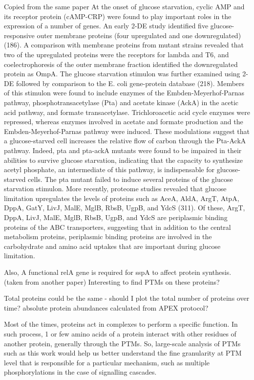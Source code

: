 \documentclass[12pt]{article}
\begin{document}
Copied from the same paper At the onset of glucose starvation, cyclic AMP and its receptor protein (cAMP-CRP) were found to play important roles in the expression of a number of genes. An early 2-DE study identified five glucose-responsive outer membrane proteins (four upregulated and one downregulated) (186). A comparison with membrane proteins from mutant strains revealed that two of the upregulated proteins were the receptors for lambda and T6, and coelectrophoresis of the outer membrane fraction identified the downregulated protein as OmpA. The glucose starvation stimulon was further examined using 2-DE followed by comparison to the E. coli gene-protein database (218). Members of this stimulon were found to include enzymes of the Embden-Meyerhof-Parnas pathway, phosphotransacetylase (Pta) and acetate kinase (AckA) in the acetic acid pathway, and formate transacetylase. Trichloroacetic acid cycle enzymes were repressed, whereas enzymes involved in acetate and formate production and the Embden-Meyerhof-Parnas pathway were induced. These modulations suggest that a glucose-starved cell increases the relative flow of carbon through the Pta-AckA pathway. Indeed, pta and pta-ackA mutants were found to be impaired in their abilities to survive glucose starvation, indicating that the capacity to synthesize acetyl phosphate, an intermediate of this pathway, is indispensable for glucose-starved cells. The pta mutant failed to induce several proteins of the glucose starvation stimulon. More recently, proteome studies revealed that glucose limitation upregulates the levels of proteins such as AceA, AldA, ArgT, AtpA, DppA, GatY, LivJ, MalE, MglB, RbsB, UgpB, and YdcS (311). Of these, ArgT, DppA, LivJ, MalE, MglB, RbsB, UgpB, and YdcS are periplasmic binding proteins of the ABC transporters, suggesting that in addition to the central metabolism proteins, periplasmic binding proteins are involved in the carbohydrate and amino acid uptakes that are important during glucose limitation.

Also, A functional relA gene is required for sspA to affect protein synthesis. (taken from another paper)
Interesting to find PTMs on these proteins?

Total proteins could be the same - should I plot the total number of proteins over time? absolute protein abundances calculated from APEX protocol?

Most of the times, proteins act in complexes to perform a specific function. In such process, 1 or few amino acids of a protein interact with other residues of another protein, generally through the PTMs. So, large-scale analysis of PTMs such as this work would help us better understand the fine granularity at PTM level that is responsible for a particular mechanism, such as multiple phosphorylations in the case of signalling cascades.
\end{document}

